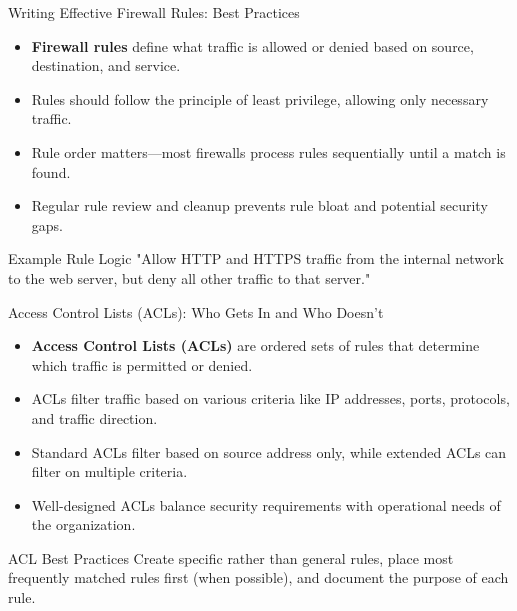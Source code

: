 \documentclass{beamer}
\begin{document}
    \begin{frame}{Writing Effective Firewall Rules: Best Practices}
    \begin{itemize}
        \item \textbf{Firewall rules} define what traffic is allowed or denied based on source, destination, and service.
        \item Rules should follow the principle of least privilege, allowing only necessary traffic.
        \item Rule order matters—most firewalls process rules sequentially until a match is found.
        \item Regular rule review and cleanup prevents rule bloat and potential security gaps.
    \end{itemize}
    
    \begin{exampleblock}{Example Rule Logic}
    "Allow HTTP and HTTPS traffic from the internal network to the web server, but deny all other traffic to that server."
    \end{exampleblock}
    \end{frame}
    
    \begin{frame}{Access Control Lists (ACLs): Who Gets In and Who Doesn't}
    \begin{itemize}
        \item \textbf{Access Control Lists (ACLs)} are ordered sets of rules that determine which traffic is permitted or denied.
        \item ACLs filter traffic based on various criteria like IP addresses, ports, protocols, and traffic direction.
        \item Standard ACLs filter based on source address only, while extended ACLs can filter on multiple criteria.
        \item Well-designed ACLs balance security requirements with operational needs of the organization.
    \end{itemize}
    
    \begin{block}{ACL Best Practices}
    Create specific rather than general rules, place most frequently matched rules first (when possible), and document the purpose of each rule.
    \end{block}
    \end{frame}
\end{document}
